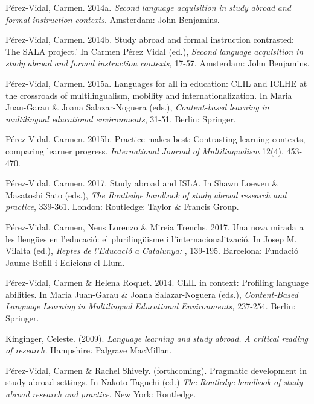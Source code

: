 Pérez-Vidal, Carmen. 2014a. \textit{Second} \textit{language} \textit{acquisition} \textit{in} \textit{study} \textit{abroad} \textit{and} \textit{formal} \textit{instruction} \textit{contexts}. Amsterdam: John Benjamins.

Pérez-Vidal, Carmen. 2014b. Study abroad and formal instruction contrasted: The SALA project.’ In Carmen Pérez Vidal (ed.), \textit{Second} \textit{language} \textit{acquisition} \textit{in} \textit{study} \textit{abroad} \textit{and} \textit{formal} \textit{instruction} \textit{contexts}, 17-57. Amsterdam: John Benjamins.

Pérez-Vidal, Carmen. 2015a. Languages for all in education: CLIL and ICLHE at the crossroads of multilingualism, mobility and internationalization. In Maria Juan-Garau \& Joana Salazar-Noguera (eds.), \textit{Content-based} \textit{learning} \textit{in} \textit{multilingual} \textit{educational} \textit{environments}, 31-51. Berlin: Springer.

Pérez-Vidal, Carmen. 2015b. Practice makes best: Contrasting learning contexts, comparing learner progress. \textit{International} \textit{Journal} \textit{of} \textit{Multilingualism} 12(4). 453-470.

Pérez-Vidal, Carmen. 2017. Study abroad and ISLA. In Shawn Loewen \& Masatoshi Sato (eds.), \textit{The} \textit{Routledge} \textit{handbook} \textit{of} \textit{study} \textit{abroad} \textit{research} \textit{and} \textit{practice}, 339-361. London: Routledge: Taylor \& Francis Group.

Pérez-Vidal, Carmen, Neus Lorenzo \& Mireia Trenchs. 2017. Una nova mirada a les llengües en l’educació: el plurilingüisme i l’internacionalització. In Josep M. Vilalta (ed.), \textit{Reptes} \textit{de} \textit{l’Educació} \textit{a} \textit{Catalunya:} \textit{\citealt{Anuari2015}}, 139-195. Barcelona: Fundació Jaume Bofill i Edicions el Llum.

Pérez-Vidal, Carmen \& Helena Roquet. 2014. CLIL in context: Profiling language abilities. In Maria Juan-Garau \& Joana Salazar-Noguera (eds.), \textit{Content-Based} \textit{Language} \textit{Learning} \textit{in} \textit{Multilingual} \textit{Educational} \textit{Environments,} 237-254. Berlin: Springer.

Kinginger, Celeste. (2009). \textit{Language} \textit{learning} \textit{and} \textit{study} \textit{abroad.} \textit{A} \textit{critical} \textit{reading} \textit{of} \textit{research.} Hampshire\textit{:} Palgrave MacMillan.

Pérez-Vidal, Carmen \& Rachel Shively. (forthcoming). Pragmatic development in study abroad settings. In Nakoto Taguchi (ed.) \textit{The} \textit{Routledge} \textit{handbook} \textit{of} \textit{study} \textit{abroad} \textit{research} \textit{and} \textit{practice}. New York: Routledge.

